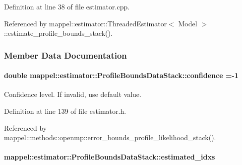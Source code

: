 Definition at line 38 of file estimator.\+cpp.



Referenced by mappel\+::estimator\+::\+Threaded\+Estimator$<$ Model $>$\+::estimate\+\_\+profile\+\_\+bounds\+\_\+stack().



\subsubsection{Member Data Documentation}
\paragraph[{\texorpdfstring{confidence}{confidence}}]{\setlength{\rightskip}{0pt plus 5cm}double mappel\+::estimator\+::\+Profile\+Bounds\+Data\+Stack\+::confidence =-\/1}\hypertarget{structmappel_1_1estimator_1_1ProfileBoundsDataStack_ac6e9709cd01fe1814dcaeaff4445c0a9}{}\label{structmappel_1_1estimator_1_1ProfileBoundsDataStack_ac6e9709cd01fe1814dcaeaff4445c0a9}


Confidence level. If invalid, use default value. 



Definition at line 139 of file estimator.\+h.



Referenced by mappel\+::methods\+::openmp\+::error\+\_\+bounds\+\_\+profile\+\_\+likelihood\+\_\+stack().

\paragraph[{\texorpdfstring{estimated\+\_\+idxs}{estimated_idxs}}]{ mappel\+::estimator\+::\+Profile\+Bounds\+Data\+Stack\+::estimated\+\_\+idxs}\hypertarget{structmappel_1_1estimator_1_1ProfileBoundsDataStack_a695c3ae49b7d9aa845cf727c269abbd4}{}\label{structmappel_1_1estimator_1_1ProfileBoundsDataStack_a695c3ae49b7d9aa845cf727c269abbd4}


